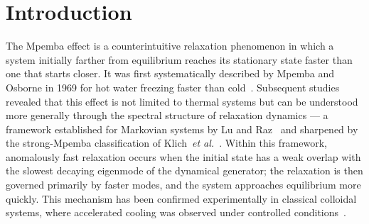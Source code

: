 \documentclass[pdflatex,sn-mathphys-num]{sn-jnl}
\begin{document}
\section{Introduction} 

The Mpemba effect is a counterintuitive relaxation phenomenon in which a system initially farther from equilibrium reaches its stationary state faster than one that starts closer. It was first systematically described by Mpemba and Osborne in 1969 for hot water freezing faster than cold~\cite{Mpemba1969}. Subsequent studies revealed that this effect is not limited to thermal systems but can be understood more generally through the spectral structure of relaxation dynamics --- a framework established for Markovian systems by Lu and Raz~\cite{Lu2017} and sharpened by the strong-Mpemba classification of Klich~\emph{et al.}~\cite{Klich2019}. Within this framework, anomalously fast relaxation occurs when the initial state has a weak overlap with the slowest decaying eigenmode of the dynamical generator; the relaxation is then governed primarily by faster modes, and the system approaches equilibrium more quickly. This mechanism has been confirmed experimentally in classical colloidal systems, where accelerated cooling was observed under controlled conditions~\cite{Kumar2020}.
\end{document}
